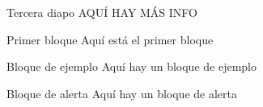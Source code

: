 \begin{frame}{Tercera diapo}
    AQUÍ HAY MÁS INFO
     \begin{block}{Primer bloque}
        Aquí está el primer bloque
    \end{block}
    \begin{exampleblock}{Bloque de ejemplo}
        Aquí hay un bloque de ejemplo
    \end{exampleblock}
    \begin{alertblock}{Bloque de alerta}
        Aquí hay un bloque de alerta
    \end{alertblock}
\end{frame}
